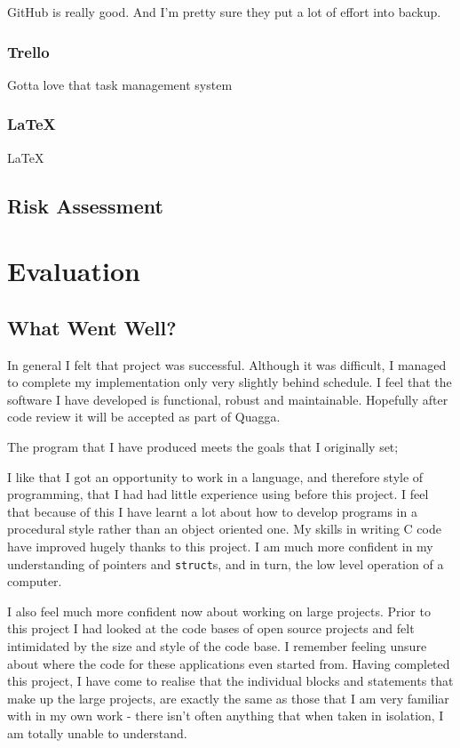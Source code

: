 \documentclass[12pt]{report}
\begin{document}
GitHub is really good. And I'm pretty sure they put a lot of effort into backup.

\subsection{Trello}
Gotta love that task management system

\subsection{\LaTeX}
\LaTeX 

\section{Risk Assessment}

\chapter{Evaluation}

\section{What Went Well?}
In general I felt that project was successful. Although it was difficult, I
managed to complete my implementation only very slightly behind schedule. I
feel that the software I have developed is functional, robust and maintainable.
Hopefully after code review it will be accepted as part of Quagga.

The program that I have produced meets the goals that I originally set; 

I like that I got an opportunity to work in a language, and therefore style of
programming, that I had had little experience using before this project.  I
feel that because of this I have learnt a lot about how to develop programs in
a procedural style rather than an object oriented one. My skills in writing C
code have improved hugely thanks to this project. I am much more confident in
my understanding of pointers and \texttt{struct}s, and in turn, the low level
operation of a computer.  

I also feel much more confident now about working on large projects. Prior to
this project I had looked at the code bases of open source projects and felt
intimidated by the size and style of the code base. I remember feeling unsure
about where the code for these applications even started from. Having completed
this project, I have come to realise that the individual blocks and statements
that make up the large projects, are exactly the same as those that I am very
familiar with in my own work - there isn't often anything that when taken in
isolation, I am totally unable to understand.
\end{document}
